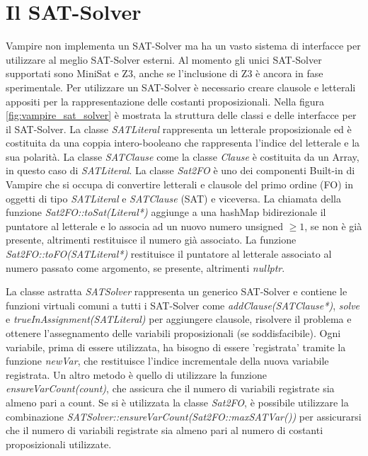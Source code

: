 \documentclass[./main.tex]{subfiles}
\begin{document}
\section{Il SAT-Solver} \label{sec:vampire_sat}
Vampire non implementa un SAT-Solver ma ha un vasto sistema di interfacce per utilizzare al meglio SAT-Solver esterni.
Al momento gli unici SAT-Solver supportati sono MiniSat e Z3, anche se l'inclusione di Z3 è ancora in fase sperimentale.
Per utilizzare un SAT-Solver è necessario creare clausole e letterali appositi per la rappresentazione delle costanti proposizionali.
Nella figura \ref{fig:vampire_sat_solver} è mostrata la struttura delle classi e delle interfacce per il SAT-Solver.
La classe \textit{SATLiteral} rappresenta un letterale proposizionale ed è costituita da una coppia intero-booleano che rappresenta
l'indice del letterale e la sua polarità. 
La classe \textit{SATClause} come la classe \textit{Clause} è costituita da un Array, in questo caso di \textit{SATLiteral}.
La classe \textit{Sat2FO} è uno dei componenti Built-in di Vampire che si occupa di convertire letterali e clausole 
del primo ordine (FO) in oggetti di tipo \textit{SATLiteral} e \textit{SATClause} (SAT) e viceversa. 
La chiamata della funzione \textit{Sat2FO::toSat(Literal*)} aggiunge a una hashMap bidirezionale il puntatore al letterale
e lo associa ad un nuovo numero unsigned $\geq 1$, se non è già presente, altrimenti restituisce il numero già associato.
La funzione \textit{Sat2FO::toFO(SATLiteral*)} restituisce il puntatore al letterale associato al numero passato come argomento,
se presente, altrimenti \textit{nullptr}.

La classe astratta \textit{SATSolver} rappresenta un generico SAT-Solver e contiene le funzioni virtuali comuni a tutti i SAT-Solver 
come \textit{addClause(SATClause*)}, \textit{solve} e \textit{trueInAssignment(SATLiteral)} per 
aggiungere clausole, risolvere il problema e ottenere l'assegnamento delle variabili proposizionali (se soddisfacibile). 
Ogni variabile, prima di essere utilizzata, ha bisogno di essere 'registrata' tramite la funzione \textit{newVar}, che restituisce
l'indice incrementale della nuova variabile registrata. Un altro metodo è quello di utilizzare la funzione \textit{ensureVarCount(count)}, che 
assicura che il numero di variabili registrate sia almeno pari a count.
Se si è utilizzata la classe \textit{Sat2FO}, è possibile utilizzare la combinazione \textit{SATSolver::ensureVarCount(Sat2FO::maxSATVar())}
per assicurarsi che il numero di variabili registrate sia almeno pari al numero di costanti proposizionali utilizzate.
\end{document}
